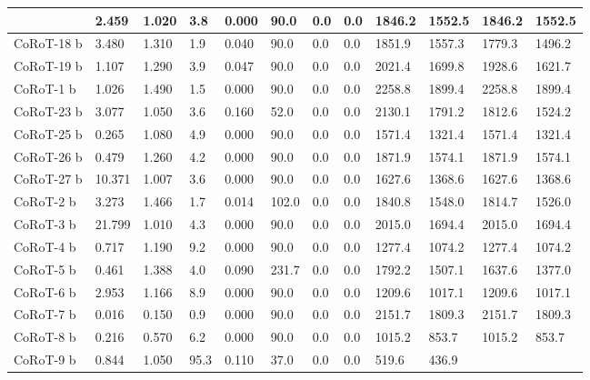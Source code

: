 \documentclass[letterpaper,10pt,english]{sphinxmanual}
\begin{document}
\begin{longtable}{|l|l|l|l|l|l|l|l|l|l|l|l|}
 & 
2.459
 & 
1.020
 & 
3.8
 & 
0.000
 & 
90.0
 & 
0.0
 & 
0.0
 & 
1846.2
 & 
1552.5
 & 
1846.2
 & 
1552.5
\\
\hline
CoRoT-18 b
 & 
3.480
 & 
1.310
 & 
1.9
 & 
0.040
 & 
90.0
 & 
0.0
 & 
0.0
 & 
1851.9
 & 
1557.3
 & 
1779.3
 & 
1496.2
\\
\hline
CoRoT-19 b
 & 
1.107
 & 
1.290
 & 
3.9
 & 
0.047
 & 
90.0
 & 
0.0
 & 
0.0
 & 
2021.4
 & 
1699.8
 & 
1928.6
 & 
1621.7
\\
\hline
CoRoT-1 b
 & 
1.026
 & 
1.490
 & 
1.5
 & 
0.000
 & 
90.0
 & 
0.0
 & 
0.0
 & 
2258.8
 & 
1899.4
 & 
2258.8
 & 
1899.4
\\
\hline
CoRoT-23 b
 & 
3.077
 & 
1.050
 & 
3.6
 & 
0.160
 & 
52.0
 & 
0.0
 & 
0.0
 & 
2130.1
 & 
1791.2
 & 
1812.6
 & 
1524.2
\\
\hline
CoRoT-25 b
 & 
0.265
 & 
1.080
 & 
4.9
 & 
0.000
 & 
90.0
 & 
0.0
 & 
0.0
 & 
1571.4
 & 
1321.4
 & 
1571.4
 & 
1321.4
\\
\hline
CoRoT-26 b
 & 
0.479
 & 
1.260
 & 
4.2
 & 
0.000
 & 
90.0
 & 
0.0
 & 
0.0
 & 
1871.9
 & 
1574.1
 & 
1871.9
 & 
1574.1
\\
\hline
CoRoT-27 b
 & 
10.371
 & 
1.007
 & 
3.6
 & 
0.000
 & 
90.0
 & 
0.0
 & 
0.0
 & 
1627.6
 & 
1368.6
 & 
1627.6
 & 
1368.6
\\
\hline
CoRoT-2 b
 & 
3.273
 & 
1.466
 & 
1.7
 & 
0.014
 & 
102.0
 & 
0.0
 & 
0.0
 & 
1840.8
 & 
1548.0
 & 
1814.7
 & 
1526.0
\\
\hline
CoRoT-3 b
 & 
21.799
 & 
1.010
 & 
4.3
 & 
0.000
 & 
90.0
 & 
0.0
 & 
0.0
 & 
2015.0
 & 
1694.4
 & 
2015.0
 & 
1694.4
\\
\hline
CoRoT-4 b
 & 
0.717
 & 
1.190
 & 
9.2
 & 
0.000
 & 
90.0
 & 
0.0
 & 
0.0
 & 
1277.4
 & 
1074.2
 & 
1277.4
 & 
1074.2
\\
\hline
CoRoT-5 b
 & 
0.461
 & 
1.388
 & 
4.0
 & 
0.090
 & 
231.7
 & 
0.0
 & 
0.0
 & 
1792.2
 & 
1507.1
 & 
1637.6
 & 
1377.0
\\
\hline
CoRoT-6 b
 & 
2.953
 & 
1.166
 & 
8.9
 & 
0.000
 & 
90.0
 & 
0.0
 & 
0.0
 & 
1209.6
 & 
1017.1
 & 
1209.6
 & 
1017.1
\\
\hline
CoRoT-7 b
 & 
0.016
 & 
0.150
 & 
0.9
 & 
0.000
 & 
90.0
 & 
0.0
 & 
0.0
 & 
2151.7
 & 
1809.3
 & 
2151.7
 & 
1809.3
\\
\hline
CoRoT-8 b
 & 
0.216
 & 
0.570
 & 
6.2
 & 
0.000
 & 
90.0
 & 
0.0
 & 
0.0
 & 
1015.2
 & 
853.7
 & 
1015.2
 & 
853.7
\\
\hline
CoRoT-9 b
 & 
0.844
 & 
1.050
 & 
95.3
 & 
0.110
 & 
37.0
 & 
0.0
 & 
0.0
 & 
519.6
 & 
436.9
 & 

\end{longtable}
\end{document}
